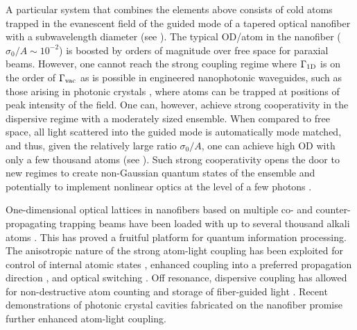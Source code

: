\documentclass[aps,pra,twocolumn]{revtex4-1} %
\newcommand{\oneD}{{\rm 1D}}
\newcommand{\vac}{{\rm vac}}
\begin{document}
A particular system that combines the elements above consists of cold atoms trapped in the evanescent field of the guided mode of a tapered optical nanofiber with a subwavelength diameter \cite{vetsch_optical_2010, lacroute_state-insensitive_2012, balykin_quantum_2014, grover_photon-correlation_2015} (see ).  
The typical OD/atom in the nanofiber ($\sigma_0/A \sim  10^{-2}$) is boosted by orders of magnitude over free space for paraxial beams. 
However, one cannot reach the strong coupling regime where $\Gamma_{\oneD}$ is on the order of $\Gamma_{\vac}$ as is possible in engineered nanophotonic waveguides, such as those arising in photonic crystals \cite{hung_trapped_2013}, where atoms can be trapped at positions of peak intensity of the field.  
One can, however, achieve strong cooperativity in the dispersive regime with a moderately sized ensemble.  When compared to free space, all light scattered into the guided mode is automatically mode matched, and thus, given the relatively large ratio $\sigma_0/A$, one can achieve high OD with only a few thousand atoms (see ).  
Such strong cooperativity opens the door to new regimes to create non-Gaussian quantum states of the ensemble \cite{dubost_efficient_2012} and potentially to implement nonlinear optics at the level of a few photons \cite{spillane_observation_2008, pittman_ultralow-power_2013, oshea_fiber-optical_2013}.


One-dimensional optical lattices in nanofibers based on multiple co- and counter-propagating trapping beams have been loaded with up to several thousand alkali atoms \cite{vetsch_optical_2010, lacroute_state-insensitive_2012}.
This has proved a fruitful platform for quantum information processing.  
The anisotropic nature of the strong atom-light coupling has been exploited for control of internal atomic states \cite{mitsch_exploiting_2014}, enhanced coupling into a preferred propagation direction \cite{petersen_chiral_2014, mitsch_quantum_2014}, and optical switching \cite{oshea_fiber-optical_2013}. 
Off resonance, dispersive coupling has allowed for non-destructive atom counting \cite{dawkins_dispersive_2011, beguin_generation_2014} 
and storage of fiber-guided light \cite{gouraud_demonstration_2015, sayrin_storage_2015}.
Recent demonstrations of photonic crystal cavities fabricated on the nanofiber \cite{wuttke_nanofiber_2012, nayak_optical_2014, schell_highly_2015} promise further enhanced atom-light coupling.
\end{document}
